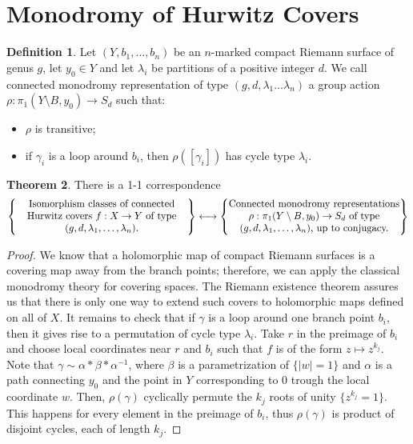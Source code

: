 \documentclass[12pt,a4paper,openright,twoside]{report}
\theoremstyle{definition} %
\newtheorem{theorem}{Theorem}[chapter]
\newtheorem{definition}[theorem]{Definition}
\begin{document}
\section{Monodromy of Hurwitz Covers}

\begin{definition}
    Let \((Y, b_1, \ldots, b_n)\) be an \(n\)-marked compact Riemann surface of genus \(g\), let \(y_0 \in Y\) and let \(\lambda_i\) be partitions of a positive integer \(d\).
    We call connected monodromy representation of type \((g,d,\lambda_1 \ldots \lambda_n)\) a group action \(\rho : \pi_1(Y \setminus B,y_0) \to S_d\) such that:
    \begin{itemize}
        \item \(\rho\) is transitive;
        \item if \(\gamma_i\) is a loop around \(b_i\), then \(\rho([\gamma_i])\) has cycle type \(\lambda_i\).
    \end{itemize}
\end{definition}

\begin{theorem}
    There is a 1-1 correspondence
    \[     
     \left\{
        \parbox{6cm}{\centering Isomorphism classes of connected Hurwitz covers \(f : X \to Y\) of type \((g,d,\lambda_1, \ldots, \lambda_n)\).}
     \right\}
     \longleftrightarrow
     \left\{
        \parbox{6cm}{\centering Connected monodromy representations \(\rho : \pi_1(Y \setminus B,y_0) \to S_d\) of type \((g,d,\lambda_1, \ldots, \lambda_n)\), up to conjugacy.}
     \right\}
    \] 
\end{theorem}

\begin{proof}
    We know that a holomorphic map of compact Riemann surfaces is a covering map away from the branch points; therefore, we can apply the classical monodromy theory for covering spaces. The Riemann existence theorem assures us that there is only one way to extend such covers to holomorphic maps defined on all of \(X\).
    It remains to check that if \(\gamma\) is a loop around one branch point \(b_i\), then it gives rise to a permutation of cycle type \(\lambda_i\). Take \(r\) in the preimage of \(b_i\) and choose local coordinates near \(r\) and \(b_i\) such that \(f\) is of the form \(z \mapsto z^{k_j}\). Note that \(\gamma \sim \alpha * \beta * \alpha^{-1}\), where \(\beta\) is a parametrization of \(\{| w | = 1\}\) and \(\alpha\) is a path connecting \(y_0\) and the point in \(Y\) corresponding to \(0\) trough the local coordinate \(w\). Then, \(\rho(\gamma)\) cyclically permute the \(k_j\) roots of unity \(\{z^{k_j} = 1\}\). This happens for every element in the preimage of \(b_i\), thus \(\rho(\gamma)\) is product of disjoint cycles, each of length \(k_j\).
    \end{proof}
\end{document}
